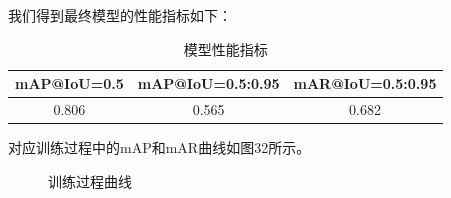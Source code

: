 \documentclass[UTF8]{ctexart}
\begin{document}
我们得到最终模型的性能指标如下：

\begin{table}[!ht]
    \begin{center}
        \begin{tabular}{ccc}
            \hline
            mAP@IoU=0.5  & mAP@IoU=0.5:0.95 & mAR@IoU=0.5:0.95 \\ \hline
            0.806 & 0.565 & 0.682 \\ \hline
            \end{tabular}
        \caption{模型性能指标}
    \end{center}
\end{table}

对应训练过程中的mAP和mAR曲线如图32所示。

\begin{figure}[h]
    \centering
    \hspace{0.5in}
    \hspace{0.5in}
    \caption{训练过程曲线}
\end{figure}
\end{document}
